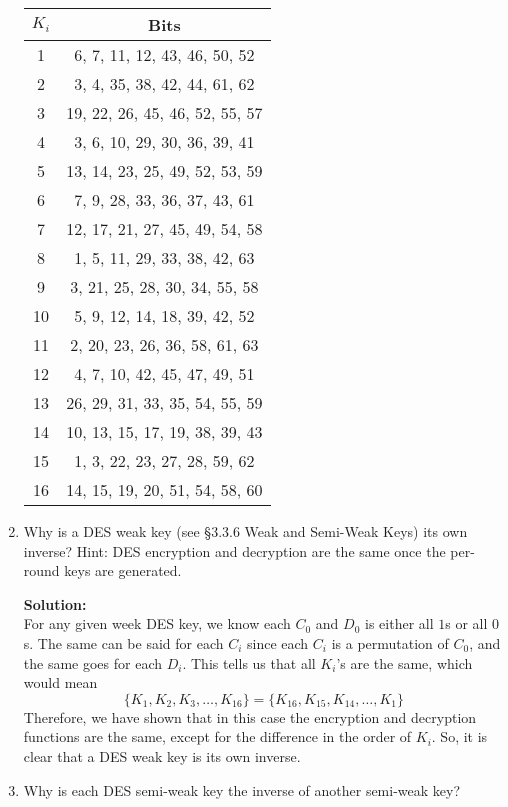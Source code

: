 \documentclass[11pt]{article}
\begin{document}
\begin{enumerate}[1)]
\begin{center}
\begin{tabular}{ |c|c| }
\hline
$K_i$ & Bits \\ 
\hline
1 & 6, 7, 11, 12, 43, 46, 50, 52 \\
2 & 3, 4, 35, 38, 42, 44, 61, 62 \\
3 & 19, 22, 26, 45, 46, 52, 55, 57 \\
4 & 3, 6, 10, 29, 30, 36, 39, 41 \\
5 & 13, 14, 23, 25, 49, 52, 53, 59 \\
6 & 7, 9, 28, 33, 36, 37, 43, 61 \\
7 & 12, 17, 21, 27, 45, 49, 54, 58 \\
8 & 1, 5, 11, 29, 33, 38, 42, 63 \\
9 & 3, 21, 25, 28, 30, 34, 55, 58 \\
10 & 5, 9, 12, 14, 18, 39, 42, 52 \\
11 & 2, 20, 23, 26, 36, 58, 61, 63 \\
12 & 4, 7, 10, 42, 45, 47, 49, 51 \\
13 & 26, 29, 31, 33, 35, 54, 55, 59 \\
14 & 10, 13, 15, 17, 19, 38, 39, 43 \\
15 & 1, 3, 22, 23, 27, 28, 59, 62 \\
16 & 14, 15, 19, 20, 51, 54, 58, 60 \\
\hline
\end{tabular}
\end{center}

\item Why is a DES weak key (see §3.3.6 Weak and Semi-Weak Keys) its own inverse? Hint: DES encryption and decryption are the same once the per-round keys are generated.

\textbf{Solution: } \\
For any given week DES key, we know each $C_0$ and $D_0$ is either all $1$s or all $0$s.  The same can be said for each $C_i$ since each $C_i$ is a permutation of $C_0$, and the same goes for each $D_i$.  This tells us that all $K_i$'s are the same, which would mean 
$$ \{ K_1, K_2, K_3, \hdots, K_{16} \} = \{ K_{16}, K_{15}, K_{14}, \hdots, K_{1} \} $$
Therefore, we have shown that in this case the encryption and decryption functions are the same, except for the difference in the order of $K_i$.  So, it is clear that a DES weak key is its own inverse.  

\item Why is each DES semi-weak key the inverse of another semi-weak key?


\end{enumerate}
\end{document}

